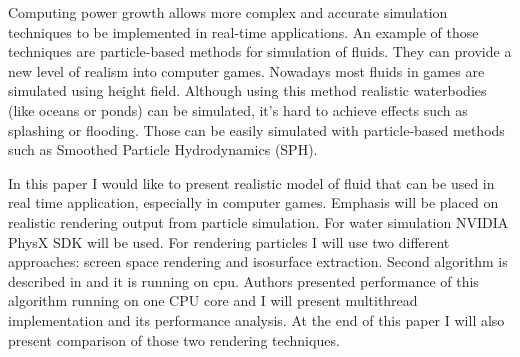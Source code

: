 


\begin{abstracts}        %

Computing power growth allows more complex and accurate simulation techniques to be implemented in 
real-time applications. An example of those techniques are particle-based methods for simulation of fluids. 
They can provide a new level of realism into computer games. Nowadays most fluids in games are simulated using height field. 
Although using this method realistic waterbodies (like oceans or ponds) can be simulated, it's hard to achieve effects such as splashing or flooding.
Those can be easily simulated with particle-based methods such as Smoothed Particle Hydrodynamics (SPH). 

In this paper I would like to present realistic model of fluid that can be used in real time application, especially in computer games. Emphasis will be placed on realistic rendering output from particle simulation.
For water simulation NVIDIA PhysX SDK will be used. For rendering particles I will use two different approaches: screen space rendering and isosurface extraction. Second algorithm is described in \cite{RosenbergBirdwell2008} and it is running on cpu. Authors presented performance of this algorithm running on one CPU core and I will present multithread implementation and its performance analysis. At the end of this paper I will also present comparison of those two rendering techniques. 


\end{abstracts}


